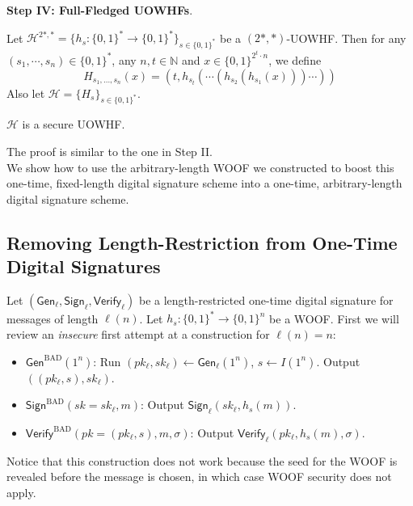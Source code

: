 \documentclass[12pt]{tufte-book}
\newcommand{\bit}{\{0,1\}}
\newcommand{\Gen}{\mathsf{Gen}}
\newcommand{\Sign}{\mathsf{Sign}}
\newcommand{\Verify}{\mathsf{Verify}}
\begin{document}
\noindent\textbf{Step IV: Full-Fledged UOWHFs}. 
\begin{construction}[(a UOWHF)]
Let $\mathcal{H}^{2*, *} = \{h_s:\bit^{*}\rightarrow\bit^{*}\}_{s\in\bit^{*}}$ be a $(2*, *)$-UOWHF. Then for any $(s_1,\cdots,s_n) \in \bit^*$, any $n, t\in\mathbb{N}$ and $x\in\bit^{2^t\cdot n}$, we define
\[
    H_{s_1,\dots,s_n}(x)=(t,h_{s_t}(\cdots(h_{s_2}(h_{s_1}(x)))\cdots))
\]
Also let $\mathcal{H} = \{H_s\}_{s \in \bit^*}$.
\end{construction}
\begin{claim}
    $\mathcal{H}$ is a secure UOWHF.
\end{claim}
The proof is similar to the one in Step II.\\
 We show how to use the arbitrary-length WOOF we constructed to boost this one-time, fixed-length digital signature scheme into a one-time, arbitrary-length digital signature scheme. 

\subsection{Removing Length-Restriction from One-Time Digital Signatures} 

Let $(\Gen_\ell, \Sign_\ell, \Verify_\ell)$ be a length-restricted one-time digital signature for messages of length $\ell(n)$. 
Let $h_s: \{0,1\}^* \to \{0,1\}^n$ be a WOOF. 
First we will review an \emph{insecure} first attempt at a construction for $\ell(n) = n$: 
\begin{itemize}
    \item $\Gen^{\text{BAD}}(1^n)$: Run $(pk_\ell, sk_\ell) \leftarrow \Gen_\ell(1^n)$, $s \leftarrow I(1^n)$. Output $((pk_\ell,s),sk_\ell)$.

    \item $\Sign^{\text{BAD}}(sk=sk_\ell, m)$: Output $\Sign_\ell(sk_\ell, h_s(m))$. 

    \item $\Verify^{\text{BAD}}(pk=(pk_\ell,s), m, \sigma)$: Output $\Verify_\ell(pk_\ell, h_s(m), \sigma)$. 
\end{itemize}
Notice that this construction does not work because the seed for the WOOF is revealed before the message is chosen, in which case WOOF security does not apply. 
\end{document}
